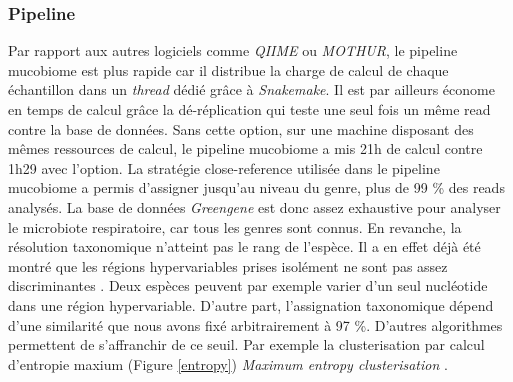 \documentclass[12pt,a4paper]{article}
\begin{document}
{\subsubsection{Pipeline}
Par rapport aux autres logiciels comme \textit{QIIME}\cite{Caporaso2010} ou \textit{MOTHUR}\cite{Schloss2009}, le pipeline mucobiome est  plus rapide car il distribue la charge de calcul de chaque échantillon dans un \textit{thread} dédié grâce à \textit{Snakemake}\cite{Koster2012}. Il est par ailleurs économe en temps de calcul grâce la dé-réplication qui teste une seul fois un même read contre la base de données. Sans cette option, sur une machine disposant des mêmes ressources de calcul, le pipeline mucobiome a mis 21h de calcul contre 1h29 avec l'option.
La stratégie close-reference utilisée dans le pipeline mucobiome a permis d'assigner jusqu'au niveau du genre, plus de 99 \% des reads analysés. La base de données \textit{Greengene} est donc assez exhaustive pour analyser le microbiote respiratoire, car tous les genres sont connus.
En revanche, la résolution taxonomique n'atteint pas le rang de l'espèce. Il a en effet déjà été montré que les régions hypervariables prises isolément ne sont pas assez discriminantes \cite{Yang2016}. Deux espèces peuvent par exemple varier d'un seul nucléotide dans une région hypervariable.
D'autre part, l'assignation taxonomique dépend d'une similarité que nous avons fixé arbitrairement à 97 \%. D'autres algorithmes permettent de s'affranchir de ce seuil. Par exemple la clusterisation par calcul d'entropie maxium (Figure \ref{entropy}) \textit{Maximum entropy clusterisation} \cite{Bobadilla2015}.


}
\end{document}
